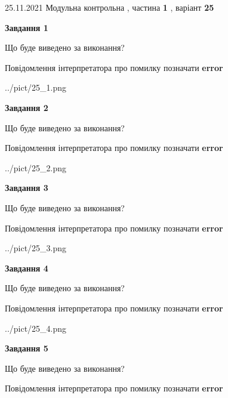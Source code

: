 \documentclass[10pt, ukrainian]{article}
\begin{document}
{25.11.2021 Модульна контрольна , частина \textbf { 1 }, варіант  \No \textbf { 25 }\par}
{
\begin {large}

{\begin {center}\textbf{Завдання 1}\end {center}}\par
Що буде виведено за виконання? \par
Повідомлення інтерпретатора про помилку позначати \textbf{error}

\begin{center}
	{../pict/25_1.png}
\end{center}
\newpage

{\begin {center}\textbf{Завдання 2}\end {center}}\par
Що буде виведено за виконання? \par
Повідомлення інтерпретатора про помилку позначати \textbf{error}

\begin{center}
	{../pict/25_2.png}
\end{center}
\newpage

{\begin {center}\textbf{Завдання 3}\end {center}}\par
Що буде виведено за виконання? \par
Повідомлення інтерпретатора про помилку позначати \textbf{error}

\begin{center}
	{../pict/25_3.png}
\end{center}
\newpage

{\begin {center}\textbf{Завдання 4}\end {center}}\par
Що буде виведено за виконання? \par
Повідомлення інтерпретатора про помилку позначати \textbf{error}

\begin{center}
	{../pict/25_4.png}
\end{center}
\newpage

{\begin {center}\textbf{Завдання 5}\end {center}}\par
Що буде виведено за виконання? \par
Повідомлення інтерпретатора про помилку позначати \textbf{error}


\end{large}}
\end{document}
